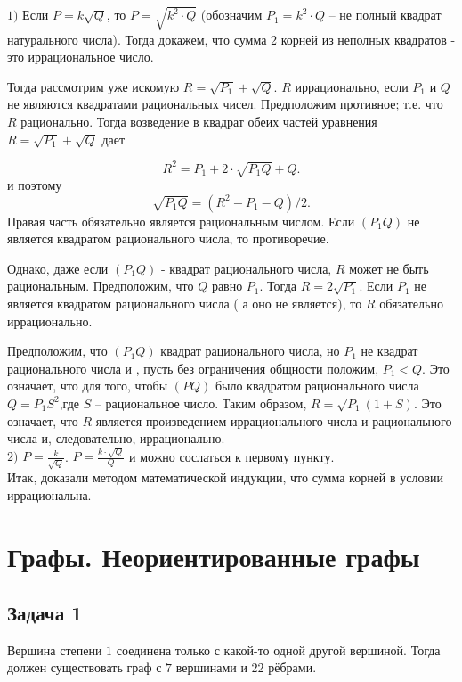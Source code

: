 \documentclass[a4paper,14pt]{article} %
\begin{document}
$1)$ Если $P = k\sqrt{Q}$, то $P = \sqrt{k^2\cdot Q}$ (обозначим $P_1 = k^2\cdot Q$ -- не полный квадрат натурального числа). Тогда докажем, что сумма 2 корней из неполных квадратов - это иррациональное число.

Тогда рассмотрим уже искомую $R = \sqrt{P_1} + \sqrt{Q}$. $R$ иррационально, если ${P_1}$ и $ Q$ не являются квадратами рациональных чисел. Предположим противное; т.е. что $R$ рационально. Тогда возведение в квадрат обеих частей уравнения $R = \sqrt{P_1} + \sqrt{Q}$ дает

\[ R^2 = P_1 + 2\cdot \sqrt{{P_1}Q} + Q.\] и поэтому \[\sqrt{{P_1}Q} = (R^2 - {P_1} - Q) \slash 2.\]
Правая часть обязательно является рациональным числом. Если $({P_1}Q)$ не является квадратом рационального числа, то противоречие.

Однако, даже если $({P_1}Q)$ - квадрат рационального числа, $R$ может не быть рациональным. Предположим, что $Q$ равно ${P_1}$. Тогда $R = 2\sqrt{{P_1}}$. Если ${P_1}$ не является квадратом рационального числа ( а оно не является), то $R$ обязательно иррационально.

Предположим, что $({P_1}Q)$ квадрат рационального числа, но ${P_1}$ не квадрат рационального числа и , пусть без ограничения общности положим, ${P_1} < Q$. Это означает, что для того, чтобы $(PQ)$ было квадратом рационального числа $Q = {P_1}S^2$,где $S$ -- рациональное число. Таким образом, $ R = \sqrt{{P_1}} (1 + S)$. Это означает, что $R$ является произведением иррационального числа и рационального числа и, следовательно, иррационально.\\

$2)$ $P = \frac{k}{\sqrt{Q}}$. $P = \frac{k\cdot \sqrt{Q}}{Q}$ и можно сослаться к первому пункту. \\

Итак, доказали методом математической индукции, что сумма корней в условии иррациональна.

\section{Графы. Неориентированные графы}

\subsection{Задача 1}

Вершина степени $1$ соединена только с какой-то одной другой вершиной. Тогда должен существовать граф с $7$ вершинами и $22$ рёбрами.
\end{document}
